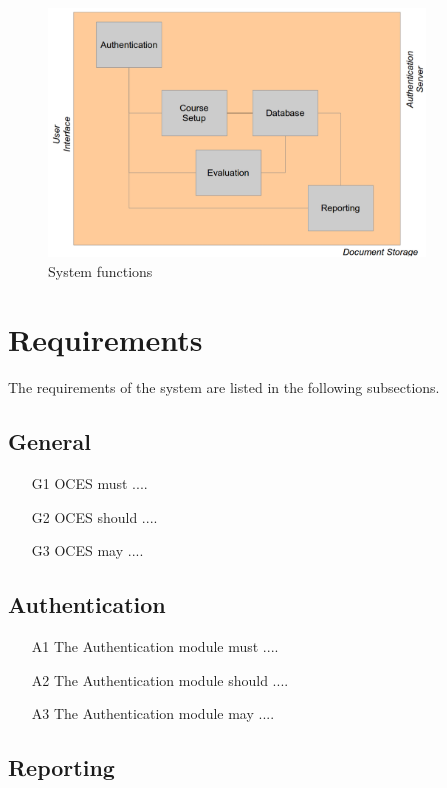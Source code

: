 \documentclass[12pt, a4paper]{report}
\begin{document}
\begin{figure}[h]
\begin{center}
\includegraphics[keepaspectratio=true,width=10cm]{figure/f2}
\end{center}
\caption{System functions}
\label{fig1}
\end{figure}

\section{Requirements}

The requirements of the system are listed in the following subsections.


\subsection{General}

	\begin{itemize}
		\item[G1] OCES must ....
		\item[G2] OCES should ....
		\item[G3] OCES may ....
	\end{itemize}

\subsection{Authentication}

	\begin{itemize}
		\item[A1] The Authentication module must ....
		\item[A2] The Authentication module should ....
		\item[A3] The Authentication module may ....
	\end{itemize}

\subsection{Reporting}
\end{document}
